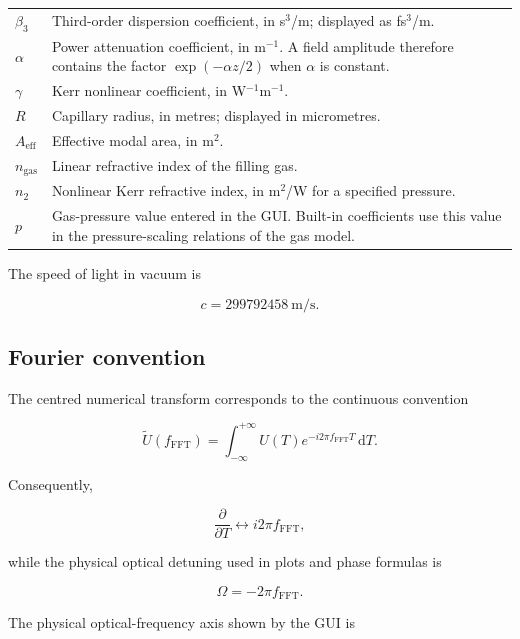\documentclass[11pt,a4paper]{article}
\newcommand{\FFT}{\mathrm{FFT}}
\newcommand{\dd}{\mathrm{d}}
\begin{document}
\begin{longtable}{p{}p{}}
$\beta_3$ & Third-order dispersion coefficient, in s$^3$/m; displayed as fs$^3$/m.\\
$\alpha$ & Power attenuation coefficient, in m$^{-1}$. A field amplitude therefore
contains the factor $\exp(-\alpha z/2)$ when $\alpha$ is constant.\\
$\gamma$ & Kerr nonlinear coefficient, in W$^{-1}$m$^{-1}$.\\
$R$ & Capillary radius, in metres; displayed in micrometres.\\
$A_{\mathrm{eff}}$ & Effective modal area, in m$^2$.\\
$n_{\mathrm{gas}}$ & Linear refractive index of the filling gas.\\
$n_2$ & Nonlinear Kerr refractive index, in m$^2$/W for a specified pressure.\\
$p$ & Gas-pressure value entered in the GUI. Built-in coefficients use this value
in the pressure-scaling relations of the gas model.\\
\bottomrule
\end{longtable}

The speed of light in vacuum is

\begin{equation}
 c=299792458\ \mathrm{m/s}.
\end{equation}

\subsection{Fourier convention}

The centred numerical transform corresponds to the continuous convention

\begin{equation}
\widetilde U(f_{\FFT})
=
\int_{-\infty}^{+\infty}
U(T)e^{-i2\pi f_{\FFT}T}\,\dd T.
\end{equation}

Consequently,

\begin{equation}
\frac{\partial}{\partial T}
\longleftrightarrow
i2\pi f_{\FFT},
\end{equation}

while the physical optical detuning used in plots and phase formulas is

\begin{equation}
\boxed{
\Omega=-2\pi f_{\FFT}.
}
\end{equation}

The physical optical-frequency axis shown by the GUI is
\end{document}
